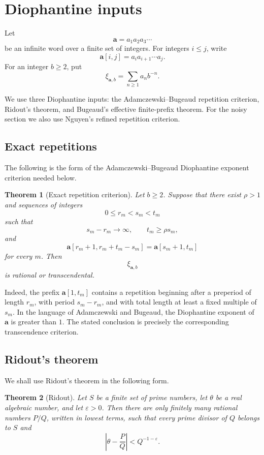 \documentclass[11pt]{amsart}
\newtheorem{theorem}{Theorem}[section]
\theoremstyle{definition}
\begin{document}
\section{Diophantine inputs}

Let
\[
\mathbf a=a_1a_2a_3\cdots
\]
be an infinite word over a finite set of integers. For integers \(i\leq j\), write
\[
\mathbf a[i,j]=a_i a_{i+1}\cdots a_j.
\]
For an integer \(b\geq 2\), put
\[
\xi_{\mathbf a,b}
=
\sum_{n\geq 1}a_n b^{-n}.
\]

We use three Diophantine inputs: the Adamczewski--Bugeaud repetition criterion, Ridout's theorem, and Bugeaud's effective finite-prefix theorem. For the noisy section we also use Nguyen's refined repetition criterion.

\subsection{Exact repetitions}

The following is the form of the Adamczewski--Bugeaud Diophantine exponent criterion needed below.

\begin{theorem}[Exact repetition criterion]
Let \(b\geq 2\). Suppose that there exist \(\rho>1\) and sequences of integers
\[
0\leq r_m<s_m<t_m
\]
such that
\[
s_m-r_m\to\infty,
\qquad
t_m\geq \rho s_m,
\]
and
\[
\mathbf a[r_m+1,r_m+t_m-s_m]
=
\mathbf a[s_m+1,t_m]
\]
for every \(m\). Then
\[
\xi_{\mathbf a,b}
\]
is rational or transcendental.
\end{theorem}

Indeed, the prefix \(\mathbf a[1,t_m]\) contains a repetition beginning after a preperiod of length \(r_m\), with period \(s_m-r_m\), and with total length at least a fixed multiple of \(s_m\). In the language of Adamczewski and Bugeaud, the Diophantine exponent of \(\mathbf a\) is greater than \(1\). The stated conclusion is precisely the corresponding transcendence criterion.

\subsection{Ridout's theorem}

We shall use Ridout's theorem in the following form.

\begin{theorem}[Ridout]
Let \(S\) be a finite set of prime numbers, let \(\theta\) be a real algebraic number, and let \(\varepsilon>0\). Then there are only finitely many rational numbers \(P/Q\), written in lowest terms, such that every prime divisor of \(Q\) belongs to \(S\) and
\[
\left|\theta-\frac{P}{Q}\right|
<
Q^{-1-\varepsilon}.
\]
\end{theorem}
\end{document}
